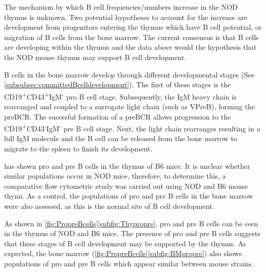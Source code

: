 The mechanism by which B cell frequencies/numbers increase in the NOD thymus is unknown. 
Two potential hypotheses to account for the increase are development from progenitors entering the thymus which have B cell potential, or migration of B cells from the bone marrow. \toref{}
The current consensus is that B cells are developing within the thymus and the data above would the hypothesis that the NOD mouse thymus may support B cell development. 

B cells in the bone marrow develop through different developmental stages (See \cref{subsubsec:committedBcelldevelopment}).
The first of these stages is the CD19\textsuperscript{+}CD43\textsuperscript{+}IgM\textsuperscript{-} pro B cell stage.
Subsequently, the IgM heavy chain is rearranged and coupled to a surrogate light chain (such as VPreB), forming the preBCR. 
The sucessful formation of a preBCR allows progression to the CD19\textsuperscript{+}CD43\textsuperscript{-}IgM\textsuperscript{-} pre B cell stage.
Next, the light chain rearranges resulting in a full IgM molecule and the B cell can be released from the bone marrow to migrate to the spleen to finish its development.


\citet{Akashi2000} has shown pro and pre B cells in the thymus of B6 mice.
It is unclear whether similar populations occur in NOD mice, therefore, to determine this, a comparative flow cytometric study was carried out using NOD and B6 mouse thymi.
As a control, the populations of pro and pre B cells in the bone marrow were also assessed, as this is the normal site of B cell development.

As shown in \cref{fig:PropreBcells}\ref{subfig:Thypropre}, pro and pre B cells can be seen in the thymus of NOD and B6 mice.
The presence of pro and pre B cells suggests that these stages of B cell development may be supported by the thymus. 
As expected, the bone marrow (\cref{fig:PropreBcells}\ref{subfig:BMpropre}) also shows populations of pro and pre B cells which appear similar between mouse strains.


